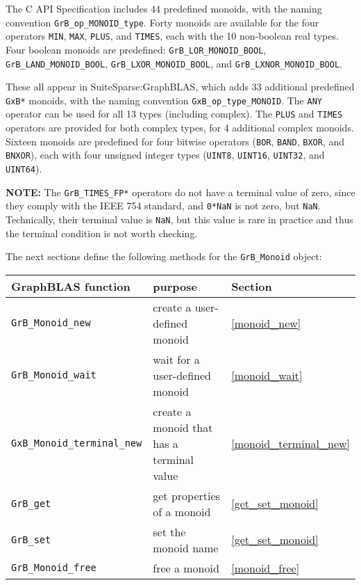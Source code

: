 \documentclass[12pt]{article}
\begin{document}
The C API Specification includes 44 predefined monoids, with the naming
convention \verb'GrB_op_MONOID_type'.  Forty monoids are available for the four
operators \verb'MIN', \verb'MAX', \verb'PLUS', and \verb'TIMES', each with the
10 non-boolean real types.  Four boolean monoids are predefined:
\verb'GrB_LOR_MONOID_BOOL', \verb'GrB_LAND_MONOID_BOOL',
\verb'GrB_LXOR_MONOID_BOOL', and \verb'GrB_LXNOR_MONOID_BOOL'.

These all appear in SuiteSparse:GraphBLAS, which adds 33 additional predefined
\verb'GxB*' monoids, with the naming convention \verb'GxB_op_type_MONOID'.  The
\verb'ANY' operator can be used for all 13 types (including complex).  The
\verb'PLUS' and \verb'TIMES' operators are provided for both complex types, for
4 additional complex monoids.  Sixteen monoids are predefined for four bitwise
operators (\verb'BOR', \verb'BAND', \verb'BXOR', and \verb'BNXOR'), each with
four unsigned integer types (\verb'UINT8', \verb'UINT16', \verb'UINT32', and
\verb'UINT64').

{\bf NOTE:}
The \verb'GrB_TIMES_FP*' operators do not have a terminal value of zero, since
they comply with the IEEE 754 standard, and \verb'0*NaN' is not zero, but
\verb'NaN'.  Technically, their terminal value is \verb'NaN', but this value is
rare in practice and thus the terminal condition is not worth checking.

The next sections define the following methods for the \verb'GrB_Monoid'
object:

\vspace{0.2in}
{\footnotesize
\begin{tabular}{lll}
\hline
GraphBLAS function   & purpose                                      & Section \\
\hline
\verb'GrB_Monoid_new'       & create a user-defined monoid                  & \ref{monoid_new} \\
\verb'GrB_Monoid_wait'      & wait for a user-defined monoid                & \ref{monoid_wait} \\
\verb'GxB_Monoid_terminal_new'  & create a monoid that has a terminal value & \ref{monoid_terminal_new} \\
\verb'GrB_get'  & get properties of a monoid       & \ref{get_set_monoid} \\
\verb'GrB_set'  & set the monoid name              & \ref{get_set_monoid} \\
\verb'GrB_Monoid_free'      & free a monoid                                 & \ref{monoid_free} \\
\hline
\end{tabular}
}
\vspace{0.2in}
\end{document}
